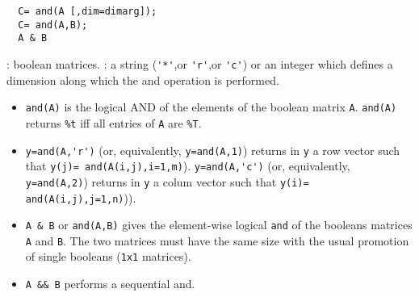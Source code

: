 


\begin{mandesc}
\end{mandesc}
\index{&} 
\begin{calling_sequence}
\begin{verbatim}
  C= and(A [,dim=dimarg]);
  C= and(A,B);
  A & B 
\end{verbatim}
\end{calling_sequence}
\begin{parameters}
  \begin{varlist}
    : boolean matrices. 
    : a string (\verb!'*'!,or \verb!'r'!,or \verb!'c'!) or an integer which defines 
    a dimension along which the and operation is performed. 
\end{varlist}
\end{parameters}

\begin{mandescription}
  \begin{itemize} 
  \item \verb!and(A)! is the logical AND of the elements of the boolean matrix \verb!A!. 
    \verb!and(A)! returns \verb!%t! iff all entries of \verb!A! are \verb!%T!. 
  \item \verb!y=and(A,'r')! (or, equivalently, \verb!y=and(A,1)!) returns in \verb+y+ a row vector 
    such that \verb!y(j)= and(A(i,j),i=1,m)!). 
    \verb!y=and(A,'c')! (or, equivalently, \verb!y=and(A,2)!) returns in \verb+y+ a colum vector 
    such that \verb!y(i)= and(A(i,j),j=1,n)!)).
  \item \verb!A & B! or \verb!and(A,B)! gives the element-wise logical \verb!and!
    of the booleans matrices \verb!A! and  \verb!B!. The two matrices must have the same size 
    with the usual promotion of single booleans (\verb!1x1! matrices). 
  \item \verb!A && B! performs a sequential and. 
  \end{itemize} 
\end{mandescription}
\begin{manseealso}
     
\end{manseealso}


